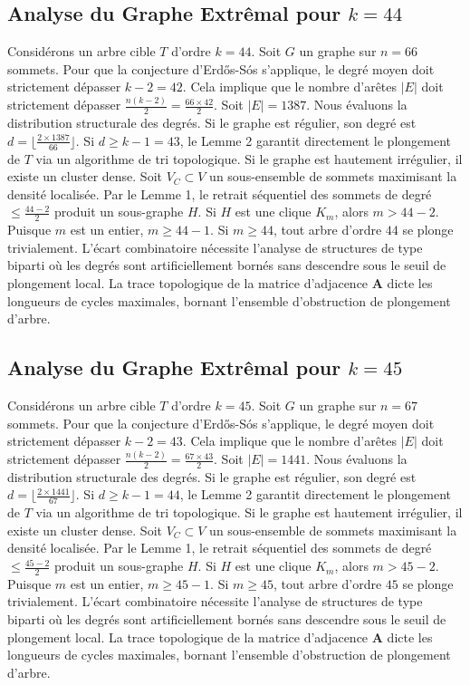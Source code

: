 \documentclass[11pt,a4paper]{article}
\begin{document}
\subsection{Analyse du Graphe Extr\^emal pour $k=44$}
Consid\'erons un arbre cible $T$ d'ordre $k=44$.
Soit $G$ un graphe sur $n=66$ sommets.
Pour que la conjecture d'Erd\H{o}s-S\'os s'applique, le degr\'e moyen doit strictement d\'epasser $k-2 = 42$.
Cela implique que le nombre d'ar\^etes $|E|$ doit strictement d\'epasser $\frac{n(k-2)}{2} = \frac{66 \times 42}{2}$.
Soit $|E| = 1387$.
Nous \'evaluons la distribution structurale des degr\'es. Si le graphe est r\'egulier, son degr\'e est $d = \lfloor \frac{2 \times 1387}{66} \rfloor$.
Si $d \geq k-1 = 43$, le Lemme 2 garantit directement le plongement de $T$ via un algorithme de tri topologique.
Si le graphe est hautement irr\'egulier, il existe un cluster dense. Soit $V_C \subset V$ un sous-ensemble de sommets maximisant la densit\'e localis\'ee.
Par le Lemme 1, le retrait s\'equentiel des sommets de degr\'e $\leq \frac{44-2}{2}$ produit un sous-graphe $H$.
Si $H$ est une clique $K_{m}$, alors $m > 44-2$. Puisque $m$ est un entier, $m \geq 44-1$. Si $m \geq 44$, tout arbre d'ordre $44$ se plonge trivialement.
L'\'ecart combinatoire n\'ecessite l'analyse de structures de type biparti o\`u les degr\'es sont artificiellement born\'es sans descendre sous le seuil de plongement local. La trace topologique de la matrice d'adjacence $\mathbf{A}$ dicte les longueurs de cycles maximales, bornant l'ensemble d'obstruction de plongement d'arbre.


\subsection{Analyse du Graphe Extr\^emal pour $k=45$}
Consid\'erons un arbre cible $T$ d'ordre $k=45$.
Soit $G$ un graphe sur $n=67$ sommets.
Pour que la conjecture d'Erd\H{o}s-S\'os s'applique, le degr\'e moyen doit strictement d\'epasser $k-2 = 43$.
Cela implique que le nombre d'ar\^etes $|E|$ doit strictement d\'epasser $\frac{n(k-2)}{2} = \frac{67 \times 43}{2}$.
Soit $|E| = 1441$.
Nous \'evaluons la distribution structurale des degr\'es. Si le graphe est r\'egulier, son degr\'e est $d = \lfloor \frac{2 \times 1441}{67} \rfloor$.
Si $d \geq k-1 = 44$, le Lemme 2 garantit directement le plongement de $T$ via un algorithme de tri topologique.
Si le graphe est hautement irr\'egulier, il existe un cluster dense. Soit $V_C \subset V$ un sous-ensemble de sommets maximisant la densit\'e localis\'ee.
Par le Lemme 1, le retrait s\'equentiel des sommets de degr\'e $\leq \frac{45-2}{2}$ produit un sous-graphe $H$.
Si $H$ est une clique $K_{m}$, alors $m > 45-2$. Puisque $m$ est un entier, $m \geq 45-1$. Si $m \geq 45$, tout arbre d'ordre $45$ se plonge trivialement.
L'\'ecart combinatoire n\'ecessite l'analyse de structures de type biparti o\`u les degr\'es sont artificiellement born\'es sans descendre sous le seuil de plongement local. La trace topologique de la matrice d'adjacence $\mathbf{A}$ dicte les longueurs de cycles maximales, bornant l'ensemble d'obstruction de plongement d'arbre.
\end{document}
